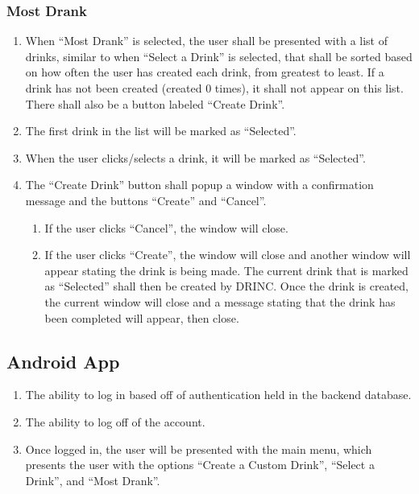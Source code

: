{	\subsubsection{Most Drank}
		\begin{enumerate}
			\item When ``Most Drank'' is selected, the user shall be presented with a list of drinks, similar to when ``Select a Drink'' is selected, that shall be sorted based on how often the user has created each drink, from greatest to least. If a drink has not been created (created 0 times), it shall not appear on this list. There shall also be a button labeled ``Create Drink''.
			\item The first drink in the list will be marked as ``Selected''.
			\item When the user clicks/selects a drink, it will be marked as ``Selected''.
			\item The ``Create Drink'' button shall popup a window with a confirmation message and the buttons ``Create'' and ``Cancel''.
			\begin{enumerate}
				\item If the user clicks ``Cancel'', the window will close.
				\item If the user clicks ``Create'', the window will close and another window will appear stating the drink is being made. The current drink that is marked as ``Selected'' shall then be created by DRINC. Once the drink is created, the current window will close and a message stating that the drink has been completed will appear, then close.
			\end{enumerate}
		\end{enumerate}
		


        


\subsection{Android App}

\begin{enumerate}
    \item The ability to log in based off of authentication held in the backend database.
    \item The ability to log off of the account.
    \item Once logged in, the user will be presented with the main menu, which presents the user with the options ``Create a Custom Drink'', ``Select a Drink'', and ``Most Drank''.
\end{enumerate}

}
